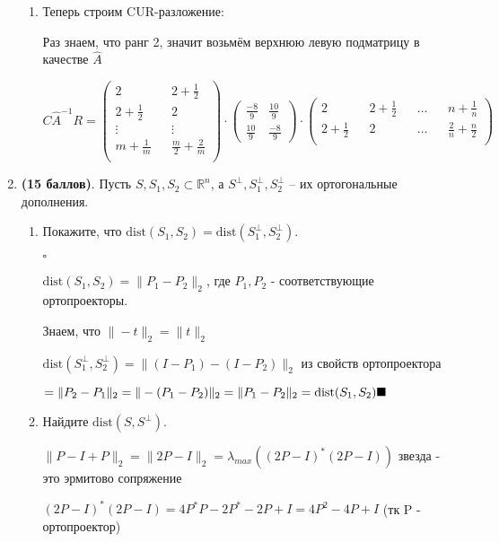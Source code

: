 \documentclass[a4paper, 11pt]{article}
\newcommand{\prob}[1]{\item \textbf{(#1 баллов)}.}
\begin{document}
\begin{enumerate}
\begin{enumerate}
			\item Теперь строим CUR-разложение:

				Раз знаем, что ранг 2, значит возьмём верхнюю левую подматрицу в качестве $\widehat A$

				$C\widehat A^{-1} R = \begin{pmatrix}
					2 && 2 + \frac{1}{2} \\
					2 + \frac{1}{2} && 2 \\
					\vdots && \vdots \\
					m + \frac{1}{m} && \frac{m}{2} + \frac{2}{m} \\
				\end{pmatrix} \cdot \begin{pmatrix}
				\frac{-8}{9} & \frac{10}{9} \\
				\frac{10}{9} & \frac{-8}{9}
			\end{pmatrix} \cdot \begin{pmatrix}
				2 && 2 + \frac{1}{2} && \dots && n + \frac{1}{n} \\
				2 + \frac{1}{2} && 2 && \dots && \frac{2}{n} + \frac{n}{2} \\
		\end{pmatrix}$

		\end{enumerate}




	\prob{15}
	Пусть $S,S_1, S_2\subset \mathbb{R}^n$, а $S^\perp,S_1^\perp, S_2^\perp$ -- их ортогональные дополнения.
	\begin{enumerate}
		\item Покажите, что $\mathrm{dist}(S_1,S_2) = \mathrm{dist}(S^\perp_1,S^\perp_2)$.

			$\square$

			$\mathrm{dist}(S_1,S_2) = \|P_1 - P_2 \|_2$, где $P_1, P_2$ - соответствующие ортопроекторы.

			Знаем, что $\|-t\|_2 = \| t\|_2$

			$\mathrm{dist}(S^\perp_1,S^\perp_2) = \|(I - P_1) - (I - P_2)\|_2$ из свойств ортопроектора

			$= \|P_2 - P_1\|_2 = \|-(P_1 - P_2)\|_2 = \|P_1 - P_2 \|_2 = \mathrm{dist}(S_1,S_2) \hfill \blacksquare$

		\item Найдите $\mathrm{dist}(S,S^\perp)$.

			$\|P - I + P \|_2 = \|2P - I \|_2 = \lambda_{max}((2P - I)^*(2P - I))$ звезда - это эрмитово сопряжение

			$(2P - I)^*(2P - I) = 4P^*P - 2P^* - 2P + I = 4P^2 - 4P + I$ (тк P - ортопроектор)


\end{enumerate}
\end{enumerate}
\end{document}

